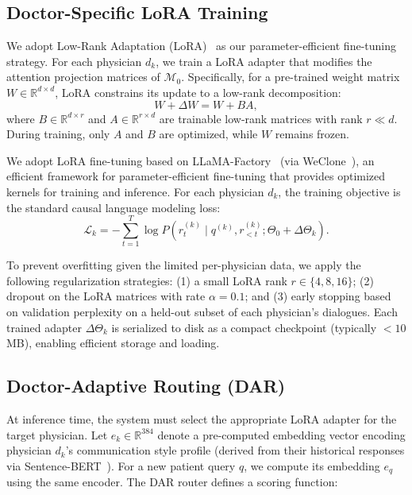 \subsection*{Doctor-Specific LoRA Training}

We adopt Low-Rank Adaptation (LoRA)~\cite{hu2021lora} as our parameter-efficient fine-tuning strategy. For each physician $d_k$, we train a LoRA adapter that modifies the attention projection matrices of $\mathcal{M}_0$. Specifically, for a pre-trained weight matrix $W \in \mathbb{R}^{d \times d}$, LoRA constrains its update to a low-rank decomposition:
\begin{equation}
W + \Delta W = W + B A,
\end{equation}
where $B \in \mathbb{R}^{d \times r}$ and $A \in \mathbb{R}^{r \times d}$ are trainable low-rank matrices with rank $r \ll d$. During training, only $A$ and $B$ are optimized, while $W$ remains frozen.

We adopt LoRA fine-tuning based on LLaMA-Factory~\cite{zheng2024llamafactory} (via WeClone~\cite{xmingXming521WeClone2026}), an efficient framework for parameter-efficient fine-tuning that provides optimized kernels for training and inference. For each physician $d_k$, the training objective is the standard causal language modeling loss:
\begin{equation}
\mathcal{L}_k = -\sum_{t=1}^{T} \log P(r_t^{(k)} \mid q^{(k)}, r_{<t}^{(k)}; \Theta_0 + \Delta \Theta_k).
\end{equation}

To prevent overfitting given the limited per-physician data, we apply the following regularization strategies: (1) a small LoRA rank $r \in \{4, 8, 16\}$; (2) dropout on the LoRA matrices with rate $\alpha = 0.1$; and (3) early stopping based on validation perplexity on a held-out subset of each physician's dialogues. Each trained adapter $\Delta \Theta_k$ is serialized to disk as a compact checkpoint (typically $<10$ MB), enabling efficient storage and loading.

\subsection*{Doctor-Adaptive Routing (DAR)}

At inference time, the system must select the appropriate LoRA adapter for the target physician. Let $e_k \in \mathbb{R}^{384}$ denote a pre-computed embedding vector encoding physician $d_k$'s communication style profile (derived from their historical responses via Sentence-BERT~\cite{reimers2019sentence}). For a new patient query $q$, we compute its embedding $e_q$ using the same encoder. The DAR router defines a scoring function:

